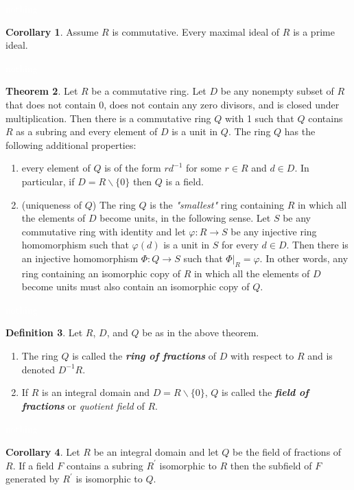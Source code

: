 \documentclass{article}
\theoremstyle{definition}
\newtheorem{thm}{Theorem}[section]
\newtheorem{cor}[thm]{Corollary}
\newtheorem{defn}[thm]{Definition}
\newcommand{\nl}{\textcolor{white}{nothing}}
\newcommand{\ra}{\rightarrow}
\newcommand{\p}{\prime}
\newcommand{\inv}{^{-1}}
\newcommand{\vphi}{\varphi}
\begin{document}
\nl

\begin{cor}
Assume $R$ is commutative. Every maximal ideal of $R$ is a prime ideal.
\end{cor}

\nl

\begin{thm}
Let $R$ be a commutative ring. Let $D$ be any nonempty subset of $R$ that does not contain 0, does not contain any zero divisors, and is closed under multiplication. Then there is a commutative ring $Q$ with 1 such that $Q$ contains $R$ as a subring and every element of $D$ is a unit in $Q$. The ring $Q$ has the following additional properties:
\begin{enumerate}
\item every element of $Q$ is of the form $rd\inv$ for some $r\in R$ and $d\in D$. In particular, if $D = R\backslash\{0\}$ then $Q$ is a field.
\item (uniqueness of $Q$) The ring $Q$ is the \textit{"smallest"} ring containing $R$ in which all the elements of $D$ become units, in the following sense. Let $S$ be any commutative ring with identity and let $\vphi:R\ra S$ be any injective ring homomorphism such that $\vphi(d)$ is a unit in $S$ for every $d\in D$. Then there is an injective homomorphism $\Phi:Q\ra S$ such that $\Phi|_R = \vphi$. In other words, any ring containing an isomorphic copy of $R$ in which all the elements of $D$ become units must also contain an isomorphic copy of $Q$.
\end{enumerate}
\end{thm}

\nl

\begin{defn}
Let $R$, $D$, and $Q$ be as in the above theorem.
\begin{enumerate}
\item The ring $Q$ is called the \textit{\textbf{ring of fractions}} of $D$ with respect to $R$ and is denoted $D\inv R$.
\item If $R$ is an integral domain and $D = R\backslash\{0\}$, $Q$ is called the \textit{\textbf{field of fractions}} or \textit{quotient field} of $R$.
\end{enumerate}
\end{defn}

\nl

\begin{cor}
Let $R$ be an integral domain and let $Q$ be the field of fractions of $R$. If a field $F$ contains a subring $R^\p$ isomorphic to $R$ then the subfield of $F$ generated by $R^\p$ is isomorphic to $Q$.
\end{cor}
\end{document}
